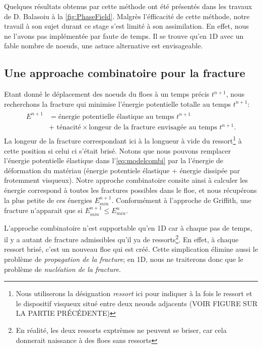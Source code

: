 Quelques résultats obtenus par cette méthode ont été présentés dans les travaux de D. Balasoiu à la \cref{fig:PhaseField}. Malgrès l'éfficacité de cette méthode, notre travail à son sujet durant ce stage s'est limité à son assimilation. En effet, nous ne l'avons pas implémentée par faute de temps. Il se trouve qu'en 1D avec un fable nombre de noeuds, une astuce alternative est envisageable. 




\subsection{Une approache combinatoire pour la fracture}
\label{subsubsec:approchecombi}


Etant donné le déplacement des noeuds du floes à un temps précis $t^{n+1}$, nous recherchons la fracture qui minimise l'énergie potentielle totalle au temps $t^{n+1}$:
\begin{align} \label{eq:modelcombi}
    \boxed{
    \begin{array}{rll}
    E^{n+1} & = \text{énergie potentielle élastique au temps } t^{n+1}  \\
    & + \text{ ténacité}\times \text{longeur de la fracture envisagée au temps }t^{n+1}.  
    \end{array}
    }
\end{align}
La longeur de la fracture correspondant ici à la longueur à vide du ressort\footnote{Nous utiliserons la désignation \emph{ressort} ici pour indiquer à la fois le ressort et le dispositif visqueux situé entre deux neouds adjacents (VOIR FIGURE SUR LA PARTIE PRÉCÉDENTE)} à cette position si celui ci s'était brisé. Notons que nous pouvons remplacer l'énergie potentielle élastique dans l'\cref{eq:modelcombi} par la l'énergie de déformation du matériau (énergie potentiele élastique + énergie dissipée par frotemment visqueux). Notre approche combinatoire consite ainsi à calculer les énergie correspond à toutes les fractures possibles dans le floe, et nous récupérons la plus petite de ces énergies $E^{n+1}_{min}$. Conformément à l'approche de Griffith, une fracture n'apparait que si $E^{n+1}_{min}\leq E^{n}_{min}$. 

L'approche combinatoire n'est supportable qu'en 1D car à chaque pas de temps, il y a autant de fracture admissibles qu'il ya de ressorts\footnote{En réalité, les deux ressorts exptrèmes ne peuvent se briser, car cela donnerait naissance à des floes sans ressorts}. En effet, à chaque ressort brisé, c'est un nouveau floe qui est créé. Cette simplication élimine aussi le problème de \emph{propagation de la fracture}; en 1D, nous ne traiterons donc que le problème de \emph{nucléation de la fracture}. 

